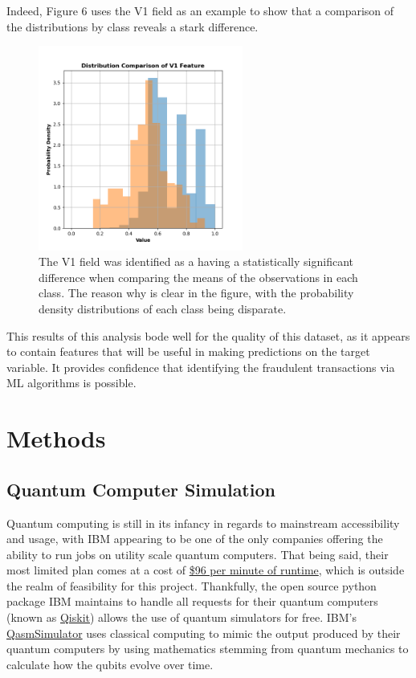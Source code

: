 \documentclass[11pt, oneside]{article}   	%
\begin{document}
Indeed, Figure 6 uses the V1 field as an example to show that a comparison of the distributions by class reveals a stark difference. 

\begin{figure}[h!]
    \centering
    \includegraphics[width=0.6\textwidth]{figures/fig_6.png}
    \captionsetup{font=small} 
    \caption{The V1 field was identified as a having a statistically significant difference when comparing the means of the observations in each class. The reason why is clear in the figure, with the probability density distributions of each class being disparate.}
    \label{fig6}
\end{figure}

This results of this analysis bode well for the quality of this dataset, as it appears to contain features that will be useful in making predictions on the target variable. It provides confidence that identifying the fraudulent transactions via ML algorithms is possible.

\section{Methods}
\subsection{Quantum Computer Simulation}

\hspace{10mm}Quantum computing is still in its infancy in regards to mainstream accessibility and usage, with IBM appearing to be one of the only companies offering the ability to run jobs on utility scale quantum computers. That being said, their most limited plan comes at a cost of \href{https://www.ibm.com/quantum/pricing}{\$96 per minute of runtime}, which is outside the realm of feasibility for this project. Thankfully, the open source python package IBM maintains to handle all requests for their quantum computers (known as \href{https://www.ibm.com/quantum/qiskit#get-started}{Qiskit}) allows the use of quantum simulators for free. IBM’s \href{https://qiskit.github.io/qiskit-aer/stubs/qiskit_aer.QasmSimulator.html}{QasmSimulator} uses classical computing to mimic the output produced by their quantum computers by using mathematics stemming from quantum mechanics to calculate how the qubits evolve over time. \\
\end{document}
